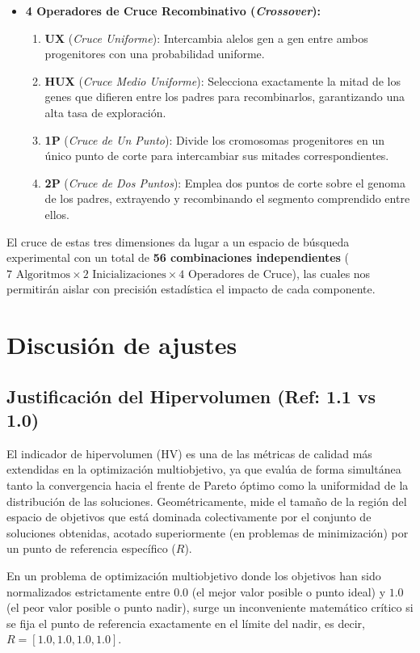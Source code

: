 \documentclass[a4paper,10pt]{article}
\begin{document}
\begin{itemize}
    \item \textbf{4 Operadores de Cruce Recombinativo (\textit{Crossover}):}
    \begin{enumerate}
        \item \textbf{UX} (\textit{Cruce Uniforme}): Intercambia alelos gen a gen entre ambos progenitores con una probabilidad uniforme.
        \item \textbf{HUX} (\textit{Cruce Medio Uniforme}): Selecciona exactamente la mitad de los genes que difieren entre los padres para recombinarlos, garantizando una alta tasa de exploración.
        \item \textbf{1P} (\textit{Cruce de Un Punto}): Divide los cromosomas progenitores en un único punto de corte para intercambiar sus mitades correspondientes.
        \item \textbf{2P} (\textit{Cruce de Dos Puntos}): Emplea dos puntos de corte sobre el genoma de los padres, extrayendo y recombinando el segmento comprendido entre ellos.
    \end{enumerate}
\end{itemize}

El cruce de estas tres dimensiones da lugar a un espacio de búsqueda experimental con un total de \textbf{56 combinaciones independientes} ($7 \text{ Algoritmos} \times 2 \text{ Inicializaciones} \times 4 \text{ Operadores de Cruce}$), las cuales nos permitirán aislar con precisión estadística el impacto de cada componente.

\clearpage
\section{Discusión de ajustes}

\subsection{Justificación del Hipervolumen (Ref: 1.1 vs 1.0)}

El indicador de hipervolumen (HV) es una de las métricas de calidad más extendidas en la optimización multiobjetivo, ya que evalúa de forma simultánea tanto la convergencia hacia el frente de Pareto óptimo como la uniformidad de la distribución de las soluciones. Geométricamente, mide el tamaño de la región del espacio de objetivos que está dominada colectivamente por el conjunto de soluciones obtenidas, acotado superiormente (en problemas de minimización) por un punto de referencia específico ($R$).

En un problema de optimización multiobjetivo donde los objetivos han sido normalizados estrictamente entre $0.0$ (el mejor valor posible o punto ideal) y $1.0$ (el peor valor posible o punto nadir), surge un inconveniente matemático crítico si se fija el punto de referencia exactamente en el límite del nadir, es decir, $R = [1.0, 1.0, 1.0, 1.0]$. 
\end{document}
